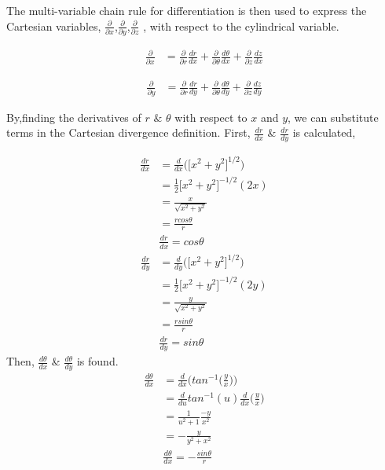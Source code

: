 \documentclass[12pt]{article}
\begin{document}
The multi-variable chain rule for differentiation is then used to express the Cartesian variables, $\frac{\partial}{\partial x}$,$\frac{\partial}{\partial y}$,$\frac{\partial}{\partial z}$ , with respect to the cylindrical variable.

\begin{align*}
	\frac{\partial }{\partial x}
	&= \frac{\partial }{\partial r}\frac{d r}{d x} +
	\frac{\partial }{\partial \theta}\frac{d \theta}{d x} +
	\frac{\partial }{\partial z}\frac{d z}{d x} 
\end{align*}

\begin{align*}
	\frac{\partial }{\partial y}
	&=
	\frac{\partial }{\partial r} 	 \frac{d r}{d y} +
	\frac{\partial }{\partial \theta} \frac{d \theta}{d y} + \frac{\partial }{\partial z}     \frac{d z}{d y}
\end{align*}


By,finding the derivatives of $r$ $\&$ $\theta$ with respect to $x$ and $y$, we can substitute terms in the Cartesian divergence definition. First, $\frac{dr}{dx}$ \& $\frac{dr}{dy}$ is calculated,

\begin{align*}
 	\frac{dr}{dx}                                      
	&= \frac{d}{dx} \Bigg(\Big[ x^2 + y^2 \Big]^{1/2}\Bigg) \\
	&= \frac{1}{2} \Big[ x^2 + y^2 \Big]^{-1/2} (2x) \\
 	&=	\frac{x}{\sqrt{x^2+y^2}}\\
 	&= \frac{r cos\theta}{r}\\
 	& \boxed{\frac{dr}{dx} = cos\theta} 
\end{align*}
\begin{align*}
	\frac{dr}{d y}
	&= \frac{d}{dy} \Bigg(\Big[ x^2 + y^2 \Big]^{1/2}\Bigg) \\
	&= \frac{1}{2}\Big[x^2 + y^2\Big]^{-1/2}(2y) \\
	&= \frac{y}{\sqrt{x^2+y^2}} \\
	&= \frac{r sin\theta}{r}\\
	& \boxed{\frac{dr}{d y} = sin\theta} 
\end{align*}
Then, $\frac{d\theta}{dx}$ \& $\frac{d\theta}{dy}$ is found.
\begin{align*}
	\frac{d \theta}{d x} 
	&= \frac{d}{dx} \Bigg(tan^{-1} \Big(\frac{y}{x}\Big)\Bigg)  \\
	&= \frac{d}{du}tan^{-1}(u) \frac{d}{dx} \Big( \frac{y}{x} \Big)\\
	&= \frac{1}{u^2  + 1} \frac{-y}{x^2} \\
	&= -\frac{y}{y^2 + x^2} \\
	& \boxed{ \frac{d \theta}{d x} =-\frac{sin \theta}{r}}
\end{align*}
\end{document}
